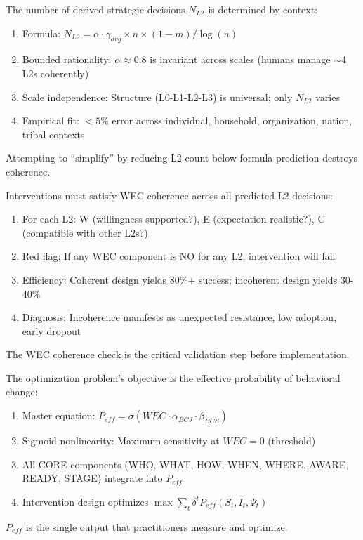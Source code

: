 \begin{theorem}
The number of derived strategic decisions $N_{L2}$ is determined by context:
\begin{enumerate}
\item Formula: $N_{L2} = \alpha \cdot \gamma_{avg} \times n \times (1-m) / \log(n)$
\item Bounded rationality: $\alpha \approx 0.8$ is invariant across scales (humans manage $\sim$4 L2s coherently)
\item Scale independence: Structure (L0-L1-L2-L3) is universal; only $N_{L2}$ varies
\item Empirical fit: $< 5\%$ error across individual, household, organization, nation, tribal contexts
\end{enumerate}
Attempting to ``simplify'' by reducing L2 count below formula prediction destroys coherence.
\end{theorem}

\begin{theorem}
Interventions must satisfy WEC coherence across all predicted L2 decisions:
\begin{enumerate}
\item For each L2: W (willingness supported?), E (expectation realistic?), C (compatible with other L2s?)
\item Red flag: If any WEC component is NO for any L2, intervention will fail
\item Efficiency: Coherent design yields 80\%+ success; incoherent design yields 30-40\%
\item Diagnosis: Incoherence manifests as unexpected resistance, low adoption, early dropout
\end{enumerate}
The WEC coherence check is the critical validation step before implementation.
\end{theorem}

\begin{theorem}
The optimization problem's objective is the effective probability of behavioral change:
\begin{enumerate}
\item Master equation: $P_{eff} = \sigma(WEC \cdot \alpha_{BCJ} \cdot \beta_{BCS})$
\item Sigmoid nonlinearity: Maximum sensitivity at $WEC = 0$ (threshold)
\item All CORE components (WHO, WHAT, HOW, WHEN, WHERE, AWARE, READY, STAGE) integrate into $P_{eff}$
\item Intervention design optimizes $\max \sum_t \delta^t P_{eff}(S_t, I_t, \Psi_t)$
\end{enumerate}
$P_{eff}$ is the single output that practitioners measure and optimize.
\end{theorem}


